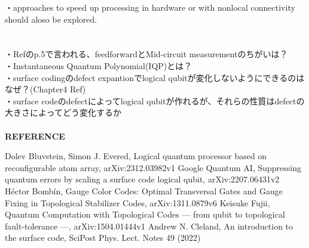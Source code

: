 \documentclass[a4paper,10.5pt]{ltjsarticle}
\begin{document}
・approaches to speed up processing in hardware or with nonlocal connectivity should aloso be explored.\\
\\
\\
・Ref\cite{1}のp.5で言われる、feedforwardとMid-circuit measurementのちがいは？\\
・Instantaneous Quantum Polynomial(IQP)とは？\\
・surface codingのdefect expantionでlogical qubitが変化しないようにできるのはなぜ？(Chapter4 Ref\cite{4})\\
・surface codeのdefectによってlogical qubitが作れるが、それらの性質はdefectの大きさによってどう変化するか\\
\\
{\Large \bfseries REFERENCE}
\begin{thebibliography}{1}
\vspace{-1.5cm}
   Dolev Bluvstein, Simon J. Evered, Logical quantum processor based on reconfigurable atom array, arXiv:2312.03982v1
   Google Quantum AI, Suppressing quantum errors by scaling a surface code logical qubit, arXiv:2207.06431v2
   Héctor Bombín, Gauge Color Codes: Optimal Transversal Gates and Gauge Fixing in Topological Stabilizer Codes, arXiv:1311.0879v6
   Keisuke Fujii, Quantum Computation with Topological Codes — from qubit to topological fault-tolerance —, arXiv:1504.01444v1
   Andrew N. Cleland, An introduction to the surface code, SciPost Phys. Lect. Notes 49 (2022)
\end{thebibliography}
\end{document}

